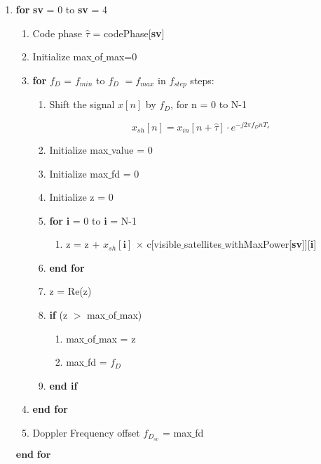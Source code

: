 \documentclass[journal,10pt,onecolumn]{article}
\begin{document}
\begin{enumerate}
    \item  \textbf{for} \textbf{sv} = 0  to \textbf{sv} = 4
    \begin{enumerate}
        \item[] Code phase $\hat{\tau}$ = codePhase[\textbf{sv}]
            \item[] Initialize max$\_$of$\_$max=0
            \item[] \textbf{for} \textbf{$f_D$} = $f_{min}$ to \textbf{$f_D$} $= f_{max}$ in $f_{step}$ steps:
            \begin{enumerate}
                \item[] Shift the signal $x[n]$ by $f_D$, for n = 0 to N-1
                
                \begin{equation}
                    x_{sh}[n] = x_{in}[n+\hat{\tau}]\cdot e ^{-j 2 \pi f_D n T_s} 
                \end{equation}
                \item[] Initialize max$\_$value = 0
                \item[] Initialize max$\_$fd    = 0
                \item[] Initialize z = 0
                \item[] \textbf{for} \textbf{i} = 0 to \textbf{i} = N-1
                \begin{enumerate}
                    \item[] z = z + $x_{sh}[\textbf{i}]$ $\times$ c[visible$\_$satellites$\_$withMaxPower[\textbf{sv}]][\textbf{i}] 
                \end{enumerate}
                \item[] \textbf{end for}
                \item[] z = Re(z)
            \item[] \textbf{if}  (z $>$ max$\_$of$\_$max)
            \begin{enumerate} 
                \item[]  max$\_$of$\_$max = z
                \item[] max$\_$fd    = \textbf{$f_D$}
            \end{enumerate}
            \item[] \textbf{end if}
            
        \end{enumerate}
        \item[] \textbf{end for}
        \item[]Doppler Frequency offset $f_{D_{sv}}$ = max$\_$fd
    \end{enumerate}
    $\textbf{end for}$
\end{enumerate}    
\end{document}
